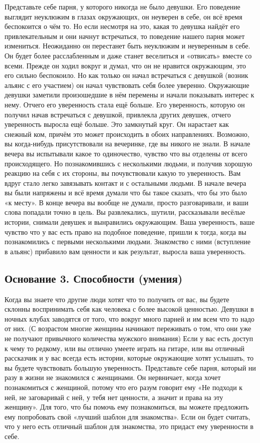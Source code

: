 Представьте себе парня, у которого никогда не было девушки. Его поведение выглядит неуклюжим в глазах окружающих, он неуверен в себе, он всё время беспокоится о чём то. Но если несмотря на это, какая то девушка найдёт его привлекательным и они начнут встречаться, то поведение нашего парня может измениться. Неожиданно он перестанет быть неуклюжим и неуверенным в себе. Он будет более расслабленным и даже станет веселиться и «отвисать» вместе со всеми. Прежде он ходил вокруг и думал, что он не нравится окружающим, это его сильно беспокоило. Но как только он начал встречаться с девушкой (возник альянс с его участием) он начал чувствовать себя более уверенно. Окружающие девушки заметили произошедшие в нём перемены и начали показывать интерес к нему. Отчего его уверенность стала ещё больше. Его уверенность, которую он получил начав встречаться с девушкой, привлекла других девушек, отчего уверенность выросла ещё больше. Это замкнутый круг. Он нарастает как снежный ком, причём это может происходить в обоих направлениях. Возможно, вы когда-нибудь присутствовали на вечеринке, где вы никого не знали. В начале вечера вы испытывали какое то одиночество, чувство что вы отделены от всего происходящего. Но познакомившись с несколькими людьми, и получив хорошую реакцию на себя с их стороны, вы почувствовали какую то уверенность. Вам вдруг стало легко завязывать контакт и с остальными людьми. В начале вечера вы были напряжены и всё время думали что бы такое сказать, что бы это было «к месту». В конце вечера вы вообще не думали, просто разговаривали, и ваши слова попадали точно в цель. Вы развлекались, шутили, рассказывали весёлые истории, снимали девушек и вынравились окружающим. Ваша уверенность, ваше чувство что у вас есть право на подобное поведение, пришли к тогда, когда вы познакомились с первыми несколькими людьми. Знакомство с ними (вступление в альянс) прибавило вам ценности и как результат, выросла ваша уверенность.

\subsection{Основание 3. Способности (умения)}

Когда вы знаете что другие люди хотят что то получить от вас, вы будете склонны воспринимать себя как человека с более высокой ценностью. Девушки в ночных клубах заводятся от того, что вокруг много парней и им всем что то надо от них. (С возрастом многие женщины начинают переживать о том, что они уже не получают привычного количества мужского внимания) Если у вас есть доступ к чему то редкому, или вы отлично умеете играть на гитаре, или вы отличный рассказчик и у вас всегда есть истории, которые окружающие хотят услышать, то вы будете чувствовать большую уверенность. Представьте себе парня, который ни разу в жизни не знакомился с женщинами. Он нервничает, когда хочет познакомиться с женщиной, потому что его разум говорит ему «Не подходи к ней, не заговаривай с ней, у тебя нет ценности, а значит и права на эту женщину». Для того, что бы помочь ему познакомиться, вы можете предложить ему попробовать свой «лучший шаблон для знакомства». Если он будет считать, что у него есть отличный шаблон для знакомства, это придаст ему уверенности в себе.

